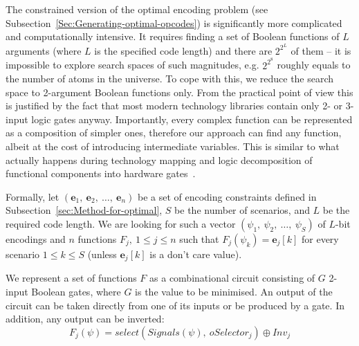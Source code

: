 The constrained version of the optimal encoding problem (see Subsection~\ref{Sec:Generating-optimal-opcodes})
is significantly more complicated and computationally intensive. It
requires finding a set of Boolean functions of $L$ arguments (where
$L$ is the specified code length) and there are $2^{2^{L}}$ of them
-- it is impossible to explore search spaces of such magnitudes, e.g.
$2^{2^{8}}$ roughly equals to the number of atoms in the universe.
To cope with this, we reduce the search space to 2-argument Boolean
functions only. From the practical point of view this is justified
by the fact that most modern technology libraries contain only 2-
or 3-input logic gates anyway. Importantly, every complex function
can be represented as a composition of simpler ones, therefore our
approach can find any function, albeit at the cost of introducing
intermediate variables. This is similar to what actually happens during
technology mapping\emph{ }and\emph{ }logic decomposition\emph{ }of
functional components into hardware gates~\cite{2002_cortadella_book}\cite{1994_de_micheli_book}.

Formally, let $(\mathbf{e}_{1},\ \mathbf{e}_{2},\ \dots,\ \mathbf{e}_{n})$
be a set of encoding constraints defined in Subsection~\ref{sec:Method-for-optimal},
$S$ be the number of scenarios, and $L$ be the required code length.
We are looking for such a vector $(\psi_{1},\ \psi_{2},\ \dots,\ \psi_{S})$
of $L$-bit encodings and $n$ functions $F_{j},\ 1\le j\le n$ such
that $F_{j}(\psi_{k})=\mathbf{e}_{j}[k]$ for every scenario $1\le k\le S$
(unless $\mathbf{e}_{j}[k]$ is a don't care value).

We represent a set of functions $F$ as a combinational circuit consisting
of $G$ 2-input Boolean gates, where $G$ is the value to be minimised.
An output of the circuit can be taken directly from one of its inputs
or be produced by a gate. In addition, any output can be inverted:
\[
F_{j}(\psi)=\mathit{select}(Signals(\psi),\ \mathit{oSelector}_{j})\oplus\mathit{Inv}_{j}
\]


